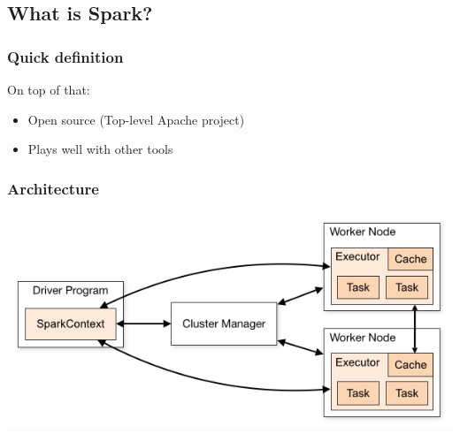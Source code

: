 \documentclass{beamer}
\begin{document}
\subsection{What is Spark?}
{
  \pagecolor{white}
\begin{frame}[plain]

\end{frame}
}
\begin{frame}
\frametitle{Quick definition}
{}

On top of that:
 \begin{itemize}
   \item Open source (Top-level Apache project)
   \item Plays well with other tools
   \end{itemize}
\end{frame}

\begin{frame}
  \frametitle{Architecture}
  \includegraphics[width=\textwidth]{images/cluster-overview.png}
\end{frame}
\end{document}
